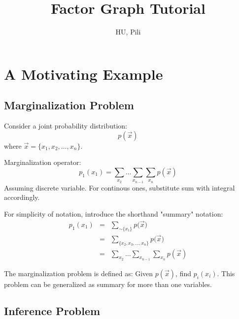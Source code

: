 \documentclass[11pt,a4paper]{article}
\author{HU, Pili}
\title{Factor Graph Tutorial}
\begin{document}
\maketitle

\begin{abstract}
	
\end{abstract}

\pagebreak
\tableofcontents
\pagebreak

\section{A Motivating Example}

\subsection{Marginalization Problem}

Consider a joint probability distribution:
\begin{equation}
	p(\vec{x})
\end{equation}
where $\vec{x}=\{x_1,x_2, \ldots, x_n\}$. 

Marginalization operator:
\begin{equation}
	p_1(x_1) = \sum_{x_2} \ldots \sum_{x_{n-1}} \sum_{x_n}p(\vec{x})
\end{equation}
Assuming discrete variable. For continous ones, substitute sum 
with integral accordingly. 

For simplicity of notation, introduce the shorthand "summary" notation:
\begin{eqnarray}
	p_1(x_1) &=& \sum_{\sim\{x_1\}}{p(\vec{x}}) \\
	&=& \sum_{\{x_2,x_3,\ldots,x_n\}}{p(\vec{x}}) \\
	&=& \sum_{x_2} \ldots \sum_{x_{n-1}} \sum_{x_n}p(\vec{x}) 
	\label{eq:marginal}
\end{eqnarray}

The marginalization problem is defined as:
Given $p(\vec{x}) $, find $p_i(x_i)$. 
This problem can be generalized as summary for more than one variables. 

\subsection{Inference Problem}

\end{document}
